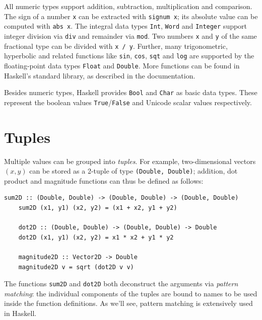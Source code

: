 \documentclass[UdineBachThesis,american,11pt]{PhdThesis}
\begin{document}
  All numeric types support addition, subtraction, multiplication and
  comparison. The sign of a number \texttt{x} can be extracted with
  \mbox{\texttt{signum x}}; its absolute value can be computed with
  \mbox{\texttt{abs x}}. The integral data types \mbox{\texttt{Int}},
  \mbox{\texttt{Word}} and \mbox{\texttt{Integer}} support integer division via
  \mbox{\texttt{div}} and remainder via \mbox{\texttt{mod}}. Two numbers
  \texttt{x} and \texttt{y} of the same fractional type can be divided with
  \mbox{\texttt{x / y}}. Further, many trigonometric, hyperbolic and related
  functions like \mbox{\texttt{sin}}, \mbox{\texttt{cos}}, \mbox{\texttt{sqt}}
  and \mbox{\texttt{log}} are supported by the floating-point data types
  \mbox{\texttt{Float}} and \mbox{\texttt{Double}}. More functions can be found
  in Haskell's standard library, as described in the documentation.

  Besides numeric types, Haskell provides \mbox{\texttt{Bool}} and
  \mbox{\texttt{Char}} as basic data types. These represent the boolean values
  \mbox{\texttt{True}}/\mbox{\texttt{False}} and Unicode scalar values
  respectively.

  \section{Tuples}

  Multiple values can be grouped into \emph{tuples}. For example,
  two-dimensional vectors \mbox{$\left(x, y\right)$} can be stored as a 2-tuple
  of type \mbox{\texttt{(Double, Double)}}; addition, dot product and magnitude
  functions can thus be defined as follows:

  \begin{Verbatim}[gobble=4,fontsize=\small]
    sum2D :: (Double, Double) -> (Double, Double) -> (Double, Double)
    sum2D (x1, y1) (x2, y2) = (x1 + x2, y1 + y2)

    dot2D :: (Double, Double) -> (Double, Double) -> Double
    dot2D (x1, y1) (x2, y2) = x1 * x2 + y1 * y2

    magnitude2D :: Vector2D -> Double
    magnitude2D v = sqrt (dot2D v v)
  \end{Verbatim}

  The functions \mbox{\texttt{sum2D}} and \mbox{\texttt{dot2D}} both deconstruct
  the arguments via \emph{pattern matching}: the individual components of the
  tuples are bound to names to be used inside the function definitions. As we'll
  see, pattern matching is extensively used in Haskell.
\end{document}
